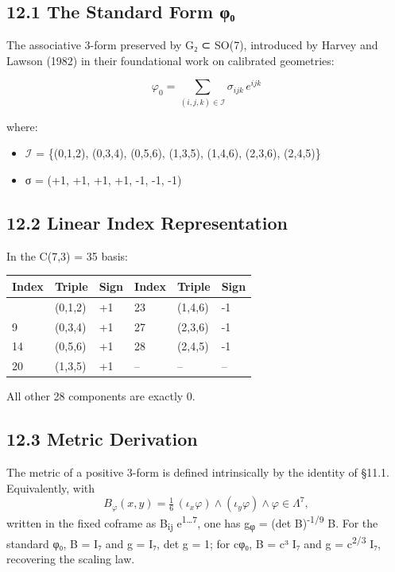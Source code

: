 \documentclass[11pt,a4paper]{article}
\begin{document}
\subsection{12.1 The Standard Form φ₀}\label{the-standard-form-ux3c6ux2080}

The associative 3-form preserved by G₂ ⊂ SO(7), introduced by Harvey and Lawson (1982) in their foundational work on calibrated geometries:

\[\varphi_0 = \sum_{(i,j,k) \in \mathcal{I}} \sigma_{ijk} \, e^{ijk}\]

where:

\begin{itemize}
\tightlist
\item
  \ensuremath{\mathcal{I}} = \{(0,1,2), (0,3,4), (0,5,6), (1,3,5), (1,4,6), (2,3,6), (2,4,5)\}
\item
  σ = (+1, +1, +1, +1, -1, -1, -1)
\end{itemize}

\subsection{12.2 Linear Index Representation}\label{linear-index-representation}

In the C(7,3) = 35 basis:

\begin{longtable}[]{@{}llllll@{}}
\toprule\noalign{}
Index & Triple & Sign & Index & Triple & Sign \\
\midrule\noalign{}
\endhead
\bottomrule\noalign{}
\endlastfoot
0 & (0,1,2) & +1 & 23 & (1,4,6) & -1 \\
9 & (0,3,4) & +1 & 27 & (2,3,6) & -1 \\
14 & (0,5,6) & +1 & 28 & (2,4,5) & -1 \\
20 & (1,3,5) & +1 & -- & -- & -- \\
\end{longtable}

All other 28 components are exactly 0.

\subsection{12.3 Metric Derivation}\label{metric-derivation}

The metric of a positive 3-form is defined intrinsically by the identity of §11.1. Equivalently, with \[B_\varphi(x,y) = \tfrac{1}{6}\,(\iota_x\varphi)\wedge(\iota_y\varphi)\wedge\varphi \in \Lambda^7,\] written in the fixed coframe as B\textsubscript{ij} e\textsuperscript{1\ldots7}, one has g\textsubscript{φ} = (det B)\textsuperscript{-1/9} B. For the standard φ₀, B = I₇ and g = I₇, det g = 1; for cφ₀, B = c³ I₇ and g = c\textsuperscript{2/3} I₇, recovering the scaling law.
\end{document}

